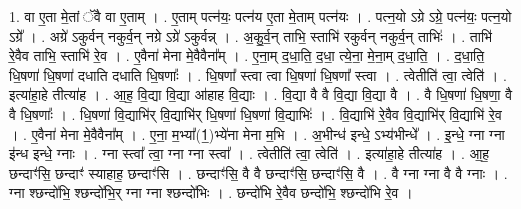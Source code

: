 \documentclass[17pt]{extarticle}
\begin{document}
1. वा ए॒ता मे॒तां ॅवै वा ए॒ताम् । . ए॒ताम् पत्न॑यः॒ पत्न॑य ए॒ता मे॒ताम् पत्न॑यः । . पत्न॒यो ऽग्रे ऽग्रे॒ पत्न॑यः॒ पत्न॒यो ऽग्रे᳚ । . अग्रे॑ ऽकुर्वन् नकुर्व॒न् नग्रे ऽग्रे॑ ऽकुर्वन्न् । . अ॒कु॒र्व॒न् ताभि॒ स्ताभि॑ रकुर्वन् नकुर्व॒न् ताभिः॑ । . ताभि॑ रे॒वैव ताभि॒ स्ताभि॑ रे॒व । . ए॒वैना॑ मेना मे॒वैवैना᳚म् । . ए॒ना॒म् द॒धा॒ति॒ द॒धा॒ त्ये॒ना॒ मे॒ना॒म् द॒धा॒ति॒ । . द॒धा॒ति॒ धि॒षणा॑ धि॒षणा॑ दधाति दधाति धि॒षणाः᳚ । . धि॒षणा᳚ स्त्वा त्वा धि॒षणा॑ धि॒षणा᳚ स्त्वा । . त्वेतीति॑ त्वा॒ त्वेति॑ । . इत्या॑हा॒हे तीत्या॑ह । . आ॒ह॒ वि॒द्या वि॒द्या आ॑हाह वि॒द्याः । . वि॒द्या वै वै वि॒द्या वि॒द्या वै । . वै धि॒षणा॑ धि॒षणा॒ वै वै धि॒षणाः᳚ । . धि॒षणा॑ वि॒द्याभि॑र् वि॒द्याभि॑र् धि॒षणा॑ धि॒षणा॑ वि॒द्याभिः॑ । . वि॒द्याभि॑ रे॒वैव वि॒द्याभि॑र् वि॒द्याभि॑ रे॒व । . ए॒वैना॑ मेना मे॒वैवैना᳚म् । . ए॒ना॒ म॒भ्या᳚(1॒)भ्ये॑ना मेना म॒भि । . अ॒भीन्ध॑ इन्धे॒ ऽभ्य॑भीन्धे᳚ । . इ॒न्धे॒ ग्ना ग्ना इ॑न्ध इन्धे॒ ग्नाः । . ग्ना स्त्वा᳚ त्वा॒ ग्ना ग्ना स्त्वा᳚ । . त्वेतीति॑ त्वा॒ त्वेति॑ । . इत्या॑हा॒हे तीत्या॑ह । . आ॒ह॒ छन्दाꣳ॑सि॒ छन्दाꣳ॑ स्याहाह॒ छन्दाꣳ॑सि । . छन्दाꣳ॑सि॒ वै वै छन्दाꣳ॑सि॒ छन्दाꣳ॑सि॒ वै । . वै ग्ना ग्ना वै वै ग्नाः । . ग्ना श्छन्दो॑भि॒ श्छन्दो॑भि॒र् ग्ना ग्ना श्छन्दो॑भिः । . छन्दो॑भि रे॒वैव छन्दो॑भि॒ श्छन्दो॑भि रे॒व । \newline
\end{document}
